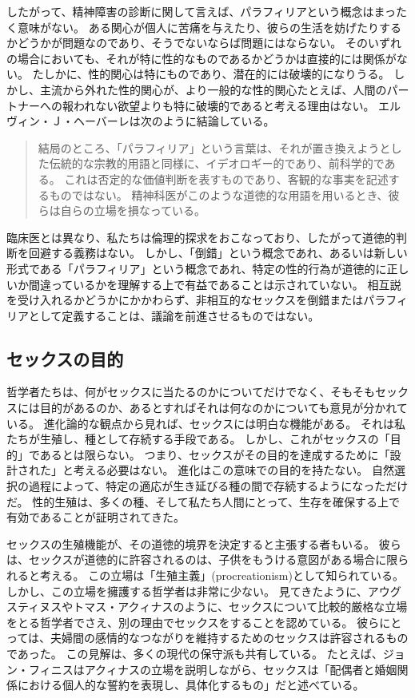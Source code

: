 \documentclass[paper=a4,book,openany]{jlreq} \usepackage{mystyle}
\begin{document}
したがって、精神障害の診断に関して言えば、パラフィリアという概念はまったく意味がない。
ある関心が個人に苦痛を与えたり、彼らの生活を妨げたりするかどうかが問題なのであり、そうでないならば問題にはならない。
そのいずれの場合においても、それが特に性的なものであるかどうかは直接的には関係がない。
たしかに、性的関心は特にものであり、潜在的には破壊的になりうる。
しかし、主流から外れた性的関心が、より一般的な性的関心{\DDASH}たとえば、人間のパートナーへの報われない欲望{\DDASH}よりも特に破壊的であると考える理由はない。
エルヴィン・Ｊ・ヘーバーレは次のように結論している。

\begin{quote}
  結局のところ、「パラフィリア」という言葉は、それが置き換えようとした伝統的な宗教的用語と同様に、イデオロギー的であり、前科学的である。
これは否定的な価値判断を表すものであり、客観的な事実を記述するものではない。
精神科医がこのような道徳的な用語を用いるとき、彼らは自らの立場を損なっている。
\citep{haeberle16:_parap}

\end{quote}

臨床医とは異なり、私たちは倫理的探求をおこなっており、したがって道徳的判断を回避する義務はない。
しかし、「倒錯」という概念であれ、あるいは新しい形式である「パラフィリア」という概念であれ、特定の性的行為が道徳的に正しいか間違っているかを理解する上で有益であることは示されていない。
相互説を受け入れるかどうかにかかわらず、非相互的なセックスを倒錯またはパラフィリアとして定義することは、議論を前進させるものではない。

\subsection{セックスの目的}

哲学者たちは、何がセックスに当たるのかについてだけでなく、そもそもセックスには目的があるのか、あるとすればそれは何なのかについても意見が分かれている。
進化論的な観点から見れば、セックスには明白な機能がある。
それは私たちが生殖し、種として存続する手段である。
しかし、これがセックスの「目的」であるとは限らない。
つまり、セックスがその目的を達成するために「設計された」と考える必要はない。
進化はこの意味での目的を持たない。
自然選択の過程によって、特定の適応が生き延びる種の間で存続するようになっただけだ。
性的生殖は、多くの種、そして私たち人間にとって、生存を確保する上で有効であることが証明されてきた。

セックスの生殖機能が、その道徳的境界を決定すると主張する者もいる。
彼らは、セックスが道徳的に許容されるのは、子供をもうける意図がある場合に限られると考える。
この立場は「生殖主義」(procreationism)として知られている。
しかし、この立場を擁護する哲学者は非常に少ない。
見てきたように、アウグスティヌスやトマス・アクィナスのように、セックスについて比較的厳格な立場をとる哲学者でさえ、別の理由でセックスをすることを認めている。
彼らにとっては、夫婦間の感情的なつながりを維持するためのセックスは許容されるものであった。
この見解は、多くの現代の保守派も共有している。
たとえば、ジョン・フィニスはアクィナスの立場を説明しながら、セックスは「配偶者と婚姻関係における個人的な誓約を表現し、具体化するもの」だと述べている\citep[p. 392]{finnis08:_marriag}。
\end{document}
